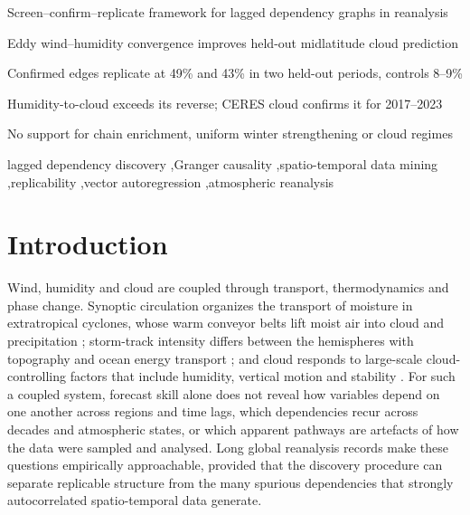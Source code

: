 \documentclass[preprint,12pt]{elsarticle}
\begin{document}
\begin{frontmatter}
\begin{highlights}
\item Screen--confirm--replicate framework for lagged dependency graphs in reanalysis
\item Eddy wind--humidity convergence improves held-out midlatitude cloud prediction
\item Confirmed edges replicate at 49\% and 43\% in two held-out periods, controls 8--9\%
\item Humidity-to-cloud exceeds its reverse; CERES cloud confirms it for 2017--2023
\item No support for chain enrichment, uniform winter strengthening or cloud regimes
\end{highlights}

\begin{keyword}
lagged dependency discovery \sep Granger causality \sep spatio-temporal data mining \sep replicability \sep vector autoregression \sep atmospheric reanalysis
\end{keyword}

\end{frontmatter}

\section{Introduction}
\label{sec:intro}

Wind, humidity and cloud are coupled through transport, thermodynamics and phase change. Synoptic circulation organizes the transport of moisture in extratropical cyclones, whose warm conveyor belts lift moist air into cloud and precipitation \citep{Heitmann2024WCB}; storm-track intensity differs between the hemispheres with topography and ocean energy transport \citep{Shaw2022Stormier}; and cloud responds to large-scale cloud-controlling factors that include humidity, vertical motion and stability \citep{Andersen2023CloudSensitivities}. For such a coupled system, forecast skill alone does not reveal how variables depend on one another across regions and time lags, which dependencies recur across decades and atmospheric states, or which apparent pathways are artefacts of how the data were sampled and analysed. Long global reanalysis records make these questions empirically approachable, provided that the discovery procedure can separate replicable structure from the many spurious dependencies that strongly autocorrelated spatio-temporal data generate.
\end{document}
